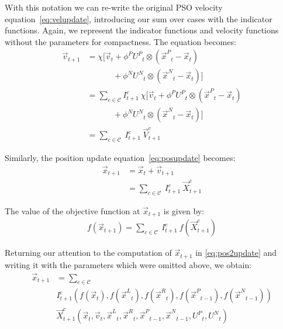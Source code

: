 \documentclass[journal,letterpaper]{IEEEtran}
\providecommand{\pers}{\ensuremath{P}}
\providecommand{\neigh}{\ensuremath{N}}
\providecommand{\leftind}{\ensuremath{L}}
\providecommand{\rightind}{\ensuremath{R}}
\providecommand{\nURand}{\ensuremath{U^\neigh}}
\providecommand{\pURand}{\ensuremath{U^\pers}}
\providecommand{\ppos}{\ensuremath{\Vec{x}}}
\providecommand{\pvel}{\ensuremath{\Vec{v}}}
\providecommand{\nbest}{\ensuremath{\Vec{x}^\neigh}}
\providecommand{\pbest}{\ensuremath{\Vec{x}^\pers}}
\providecommand{\constriction}{\ensuremath{\chi}}
\providecommand{\ncoeff}{\ensuremath{\phi^\neigh}}
\providecommand{\pcoeff}{\ensuremath{\phi^\pers}}
\providecommand{\ofunc}{\ensuremath{f}}
\providecommand{\indic}{\ensuremath{I}}
\providecommand{\specvel}{\ensuremath{\vec{V}}}
\providecommand{\specpos}{\ensuremath{\vec{X}}}
\providecommand{\leftn}{\ensuremath{\Vec{x}^\leftind}}
\providecommand{\rightn}{\ensuremath{\Vec{x}^\rightind}}
\providecommand{\caseset}{\ensuremath{\mathcal{C}}}
\begin{document}
With this notation we can re-write the original PSO velocity
equation~\eqref{eq:velupdate}, introducing our sum over cases with the
indicator functions.  Again, we represent the indicator functions and velocity
functions without the parameters for compactness.  The equation becomes:
\begin{align}
\nonumber
	\pvel_{t+1} &=
		\constriction \bigl[ \pvel_t
			+ \pcoeff\pURand_{t}\otimes(\pbest_{t} - \ppos_{t}) \\
\nonumber
			& \quad \quad \quad \, + \ncoeff\nURand_{t}\otimes(\nbest_{t} -
			\ppos_{t}) \bigr] \\
\nonumber
	&= \sum_{c \in \caseset} \indic_{t+1}^{c} \ \constriction \bigl[ \pvel_t
			+ \pcoeff\pURand_{t}\otimes(\pbest_{t} - \ppos_{t}) \\
\nonumber
			& \quad \quad \quad \, + \ncoeff\nURand_{t}\otimes(\nbest_{t} -
			\ppos_{t}) \bigr]  \\
\label{eq:vel2update}
	&= \sum_{c \in \caseset} \ \indic_{t+1}^{c} \ \specvel_{t+1}^{c} 
\end{align}

Similarly, the position update equation~\eqref{eq:posupdate} becomes:
\begin{align}
\nonumber
	\ppos_{t+1} &= \ppos_{t} + \pvel_{t+1} \\
\label{eq:pos2update}
	&= \sum_{c \in \caseset} \ \indic_{t+1}^{c} \ \specpos_{t+1}^{c} 
\end{align}

The value of the objective function at $\ppos_{t+1}$ is given by:
\begin{align}
\label{eq:val2update}
	\ofunc (\ppos_{t+1}) = \sum_{c \in \caseset} \ \indic_{t+1}^{c}
	\ \ofunc(\specpos_{t+1}^{c})
\end{align}

Returning our attention to the computation of $\ppos_{t+1}$ in
\eqref{eq:pos2update} and writing it with the parameters which were omitted
above, we obtain:
\begin{align}
\nonumber
  \ppos_{t+1} &= \sum_{c \in \caseset} \\
\nonumber
	& \indic_{t+1}^{c}(\ofunc ( \ppos_{t} ) ,\ofunc(\leftn_{t}),
	\ofunc(\rightn_{t}) ,\ofunc(\pbest_{t-1}) ,\ofunc(\nbest_{t-1})) \\
\label{eq:val2updatelong}
	& \specpos_{t+1}^{c}(\ppos_{t},\pvel_{t},\leftn_{t},\rightn_{t},
	\pbest_{t-1},\nbest_{t-1},\pURand_{t}, \nURand_{t})
\end{align}
\end{document}
